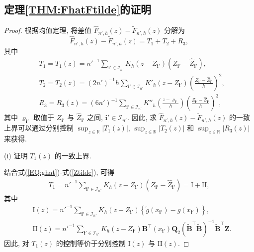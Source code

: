 \documentclass[a4paper,openay,14pt]{ctexbook}
\numberwithin{equation}{section}
\numberwithin{lem}{section}
\begin{document}
\subsection{定理\ref{THM:FhatFtilde}的证明}
\begin{proof}
根据均值定理, 将差值 $\hat{F}_{n',h}(z)-\tilde{F}_{n',h}(z)$ 分解为
\begin{equation}\label{EQ:Fnhhat-Fnhtilde}
    \hat{F}_{n',h}(z)-\tilde{F}_{n',h}(z)=T_1+T_2+R_3,
\end{equation}
其中
\begin{align*}
    &T_1=T_1(z)=n'^{-1}\sum_{\mathbf{i}'\in\mathcal{I}_{n'}}K_h\left(z-Z_{\mathbf{i}'}\right)\left(Z_{\mathbf{i}'}-\hat{Z}_{\mathbf{i}'}\right),\\
    &T_2=T_2(z)=(2n')^{-1}h\sum_{\mathbf{i}'\in\mathcal{I}_{n'}}K'_h\left(z-Z_{\mathbf{i}'}\right)\left(\frac{Z_{\mathbf{i}'}-\hat{Z}_{\mathbf{i}'}}{h}\right)^2,\\
    &R_3=R_3(z)=(6n')^{-1}\sum_{\mathbf{i}'\in\mathcal{I}_{n'}}K''_h\left(\frac{z-\varrho_{\mathbf{i}'}}{h}\right)\left(\frac{Z_{\mathbf{i}'}-\hat{Z}_{\mathbf{i}'}}{h}\right)^3,
\end{align*}
其中 $\varrho_{\mathbf{i}'}$ 取值于 $Z_{\mathbf{i}'}$ 与 $\hat{Z}_{\mathbf{i}'}$ 之间, $\mathbf{i}'\in\mathcal{I}_{n'}$. 因此, 求 $\hat{F}_{n',h}(z)-\tilde{F}_{n',h}(z)$ 的一致上界可以通过分别控制 $\sup_{z\in\mathbb{R}}|T_1(z)|$, $\sup_{z\in\mathbb{R}}|T_2(z)|$ 和 $\sup_{z\in\mathbb{R}}|R_3(z)|$ 来获得.

(i) 证明 $T_1(z)$ 的一致上界.

结合式(\ref{EQ:ghat})-式(\ref{Ztilde}), 可得
\begin{align}\label{EQ:T1}
    T_1
    =n'^{-1}\sum_{\mathbf{i}'\in\mathcal{I}_{n'}}
      K_h(z-Z_{\mathbf{i}'})\left(Z_{\mathbf{i}'}-\hat{Z}_{\mathbf{i}'}\right)
    =\mathrm{I}+\mathrm{II},
\end{align}
其中
\begin{align*}
    &\mathrm{I}(z)
    =n'^{-1}\sum_{\mathbf{i}'\in\mathcal{I}_{n'}}
      K_h(z-Z_{\mathbf{i}'})
      \left\{\tilde{g}(x_{\mathbf{i}'})-g(x_{\mathbf{i}'})\right\},\\
    &\mathrm{II}(z)
    =n'^{-1}\sum_{\mathbf{i}'\in\mathcal{I}_{n'}}
      K_h(z-Z_{\mathbf{i}'})
      \mathbf{B}^{\top}(x_{\mathbf{i}'})\mathbf{Q}_2
      \left(\tilde{\mathbf{B}}^{\top}\tilde{\mathbf{B}}\right)^{-1}
      \tilde{\mathbf{B}}^{\top}\mathbf{Z}.
\end{align*}
因此, 对 $T_1(z)$ 的控制等价于分别控制 $\mathrm{I}(z)$ 与 $\mathrm{II}(z)$.


\end{proof}
\end{document}
